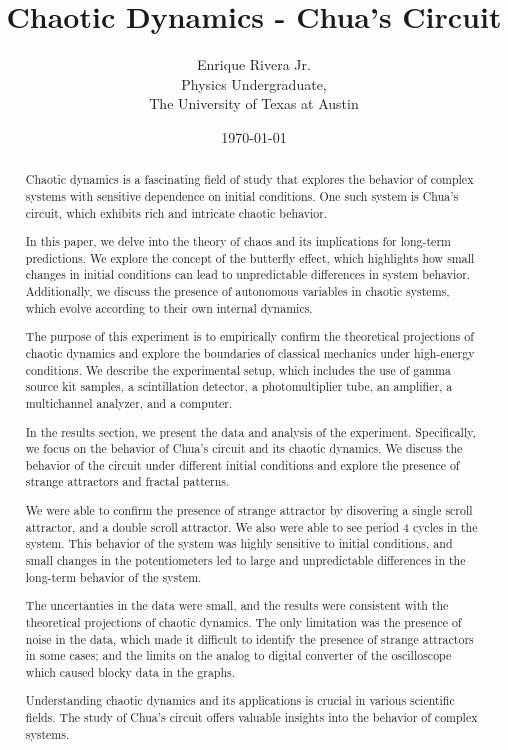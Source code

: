 \documentclass[12pt]{article}
\title{Chaotic Dynamics - Chua's Circuit}
\author{Enrique Rivera Jr. \\
                Physics Undergraduate, \\ 
                The University of Texas at Austin}
\date{\today}
\begin{document}
\maketitle

\begin{abstract}
        Chaotic dynamics is a fascinating field of study that explores the behavior of complex systems with sensitive 
        dependence on initial conditions. One such system is Chua's circuit, which exhibits rich and intricate chaotic behavior.

        In this paper, we delve into the theory of chaos and its implications for long-term predictions. We explore the concept 
        of the butterfly effect, which highlights how small changes in initial conditions can lead to unpredictable differences 
        in system behavior. Additionally, we discuss the presence of autonomous variables in chaotic systems, which evolve according 
        to their own internal dynamics.

        The purpose of this experiment is to empirically confirm the theoretical projections of chaotic dynamics and explore the 
        boundaries of classical mechanics under high-energy conditions. We describe the experimental setup, which includes the 
        use of gamma source kit samples, a scintillation detector, a photomultiplier tube, an amplifier, a multichannel analyzer, and a computer.

        In the results section, we present the data and analysis of the experiment. Specifically, we focus on the behavior of Chua's 
        circuit and its chaotic dynamics. We discuss the behavior of the circuit under different initial conditions and explore the presence of strange attractors and fractal patterns.

        We were able to confirm the presence of strange attractor by disovering a single scroll attractor, and a double scroll attractor.
        We also were able to see period 4 cycles in the system. This behavior of the system was highly sensitive to initial conditions, 
        and small changes in the potentiometers led to large and unpredictable differences in the long-term behavior of the system.

        The uncertanties in the data were small, and the results were consistent with the theoretical projections of chaotic dynamics.
        The only limitation was the presence of noise in the data, which made it difficult to identify the presence of strange attractors in some cases; 
        and the limits on the analog to digital converter of the oscilloscope which caused blocky data in the graphs.

        Understanding chaotic dynamics and its applications is crucial in various scientific fields. The study of Chua's circuit offers valuable insights into the behavior of complex systems.
\end{abstract}
\end{document}
